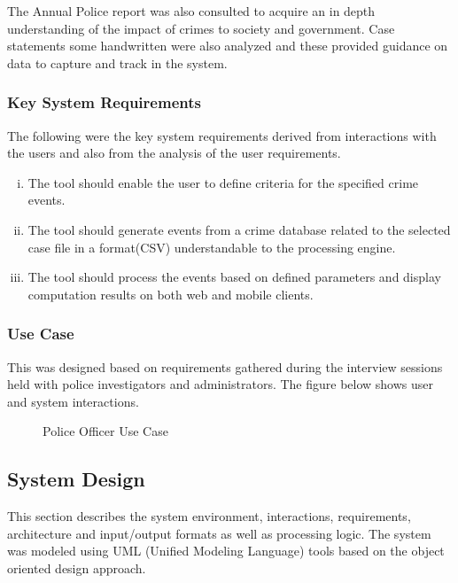 \noindent The Annual Police report was also consulted to acquire an in depth understanding of the impact of crimes to society and government. Case statements some handwritten were also analyzed and these provided guidance on data to capture and track in the system.

\subsubsection{Key System Requirements}

\noindent The following were the key system requirements derived from interactions with the users and also from the analysis of the user requirements.

\begin{enumerate}[(i)]
\item The tool should enable the user to define criteria for the specified crime events.
\item The tool should generate events from a crime database related to the selected case file in a format(CSV) understandable to the processing engine.
\item The tool should process the events based on defined parameters and display computation results on both web and mobile clients.
 \end{enumerate}

\subsubsection{Use Case}

\noindent This was designed based on requirements gathered during the interview sessions held with police investigators and administrators. The figure below shows user and system interactions.



\begin{center}
\begin{figure}[h]
\caption{Police Officer Use Case}

\end{figure}
\end{center}


\subsection{System Design}

\noindent This section describes the system environment, interactions, requirements, architecture and input/output formats as well as processing logic. The system was modeled using UML (Unified Modeling Language) tools based on the object oriented design approach.

